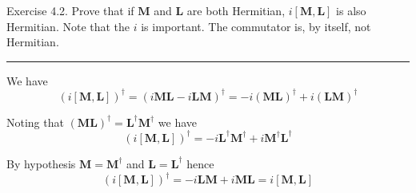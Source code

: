 \documentclass[12pt]{article}
\begin{document}
Exercise 4.2.
Prove that if $\mathbf M$ and $\mathbf L$ are both Hermitian,
$i[\mathbf M,\mathbf L]$ is also Hermitian.
Note that the $i$ is important.
The commutator is, by itself, not Hermitian.

\bigskip
\hrule

\bigskip
We have
\begin{equation*}
(i[\mathbf M,\mathbf L])^\dag=(i\mathbf M\mathbf L-i\mathbf L\mathbf M)^\dag
=-i(\mathbf M\mathbf L)^\dag+i(\mathbf L\mathbf M)^\dag
\end{equation*}

Noting that $(\mathbf M\mathbf L)^\dag=\mathbf L^\dag\mathbf M^\dag$ we have
\begin{equation*}
(i[\mathbf M,\mathbf L])^\dag
=-i\mathbf L^\dag\mathbf M^\dag+i\mathbf M^\dag\mathbf L^\dag
\end{equation*}

By hypothesis $\mathbf M=\mathbf M^\dag$ and $\mathbf L=\mathbf L^\dag$ hence
\begin{equation*}
(i[\mathbf M,\mathbf L])^\dag
=-i\mathbf L\mathbf M+i\mathbf M\mathbf L=i[\mathbf M,\mathbf L]
\end{equation*}
\end{document}
